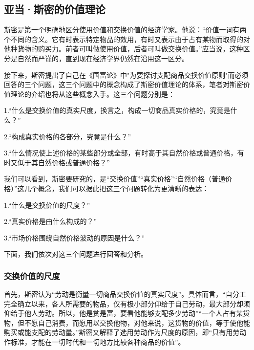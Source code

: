 \subsection{亚当·斯密的价值理论}

斯密是第一个明确地区分使用价值和交换价值的经济学家\cite[122]{CaiJiMingCongGuDianZhengZhiJingJiXueDaoZhongGuoTeSeSheHuiZhuYiZhengZhiJingJiXueJiYuZhongGuoShiJiaoDeZhengZhiJingJiXueYanBianShangCe2023}。他说：“价值一词有两个不同的含义。它有时表示特定物品的效用，有时又表示由于占有某物而取得的对他种货物的购买力。前者可叫做使用价值，后者可叫做交换价值。”\cite[24]{YaDang*SiMiGuoFuLun2015}应当说，这种区分是自然而严谨的，直到现在经济学界仍然在沿用这一区分。

接下来，斯密提出了自己在《国富论》中"为要探讨支配商品交换价值原则"\cite[24]{YaDang*SiMiGuoFuLun2015}而必须回答的三个问题，这三个问题中的概念构成了斯密价值理论的体系，笔者对斯密价值理论的介绍也将从这些概念入手。这三个问题分别是：

1.“什么是交换价值的真实尺度，换言之，构成一切商品真实价格的，究竟是什么？”\cite[24]{YaDang*SiMiGuoFuLun2015}

2.“构成真实价格的各部分，究竟是什么？”\cite[24]{YaDang*SiMiGuoFuLun2015}

3.“什么情况使上述价格的某些部分或全部，有时高于其自然价格或普通价格，有时又低于其自然价格或普通价格？”\cite[24]{YaDang*SiMiGuoFuLun2015}

我们可以看到，斯密要研究的，是“交换价值”“真实价格”“自然价格（普通价格）”这几个概念，我们可以据此把这三个问题转化为更清晰的表达：

1.“什么是交换价值的尺度？”

2.“真实价格是由什么构成的？”

3.“市场价格围绕自然价格波动的原因是什么？”

下面，我们依次对这三个问题进行回答和分析。

\subsubsection{交换价值的尺度}

首先，斯密认为“劳动是衡量一切商品交换价值的真实尺度”\Cite[25]{YaDang*SiMiGuoFuLun2015}。具体而言，“自分工完全确立以来，各人所需要的物品，仅有极小部分仰给于自己劳动，最大部分却须仰给于他人劳动。所以，他是贫是富，要看他能够支配多少劳动”\cite[25]{YaDang*SiMiGuoFuLun2015}“一个人占有某货物，但不愿自己消费，而愿用以交换他物，对他来说，这货物的价值，等于使他能购买或能支配的劳动量。”\cite[25]{YaDang*SiMiGuoFuLun2015}斯密又解释了选用劳动作为尺度的原因，即“只有用劳动作标准，才能在一切时代和一切地方比较各种商品的价值”\cite[31]{YaDang*SiMiGuoFuLun2015}。


